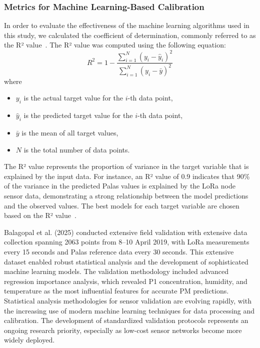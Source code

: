 \documentclass[conference]{IEEEtran}
\begin{document}
\subsubsection{Metrics for Machine Learning-Based Calibration}
In order to evaluate the effectiveness of the machine learning algorithms used in this study, we calculated the coefficient of determination, commonly referred to as the R² value~\cite{balagopal2025}. The R² value was computed using the following equation:
\begin{equation}
R^{2} = 1 - \frac{\sum_{i=1}^{N} (y_i - \hat{y}_i)^{2}}{\sum_{i=1}^{N} (y_i - \bar{y})^{2}}
\end{equation}
where
\begin{itemize}
    \item $y_i$ is the actual target value for the $i$-th data point,
    \item $\hat{y}_i$ is the predicted target value for the $i$-th data point,
    \item $\bar{y}$ is the mean of all target values,
    \item $N$ is the total number of data points.
\end{itemize}
The R² value represents the proportion of variance in the target variable that is explained by the input data. For instance, an R² value of 0.9 indicates that 90\% of the variance in the predicted Palas values is explained by the LoRa node sensor data, demonstrating a strong relationship between the model predictions and the observed values. The best models for each target variable are chosen based on the R² value~\cite{balagopal2025}.

Balagopal et al. (2025) conducted extensive field validation with extensive data collection spanning 2063 points from 8--10 April 2019, with LoRa measurements every 15 seconds and Palas reference data every 30 seconds. This extensive dataset enabled robust statistical analysis and the development of sophisticated machine learning models. The validation methodology included advanced regression importance analysis, which revealed P1 concentration, humidity, and temperature as the most influential features for accurate PM predictions. Statistical analysis methodologies for sensor validation are evolving rapidly, with the increasing use of modern machine learning techniques for data processing and calibration. The development of standardized validation protocols represents an ongoing research priority, especially as low-cost sensor networks become more widely deployed.~\cite{balagopal2025}
\end{document}
